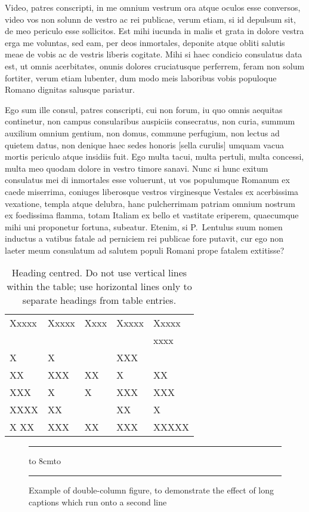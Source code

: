 \documentclass{ifacmtg}
\begin{document}
Video, patres conscripti, in me omnium vestrum ora atque oculos esse
conversos, video vos non solunn de vestro ac rei publicae, verum etiam,
si id depulsum sit, de meo periculo esse sollicitos. Est mihi iucunda in
malis et grata in dolore vestra erga me voluntas, sed eam, per deos
inmortales, deponite atque obliti salutis meae de vobis ac de vestris
liberis cogitate. Mihi si haec condicio consulatus data est, ut omnis
acerbitates, onunis dolores cruciatusque perferrem, feram non solum
fortiter, verum etiam lubenter, dum modo meis laboribus vobis populoque
Romano dignitas salusque pariatur. \par Ego sum ille consul, patres
conscripti, cui non forum, iu quo omnis aequitas continetur, non campus
consularibus auspiciis consecratus, non curia, summum auxilium omnium
gentium, non domus, commune perfugium, non lectus ad quietem datus, non
denique haec sedes honoris [sella curulis] umquam vacua mortis periculo
atque insidiis fuit.  Ego multa tacui, multa pertuli, multa concessi,
multa meo quodam dolore in vestro timore sanavi. Nunc si hunc exitum
consulatus mei di inmortales esse voluerunt, ut vos populumque Romanum
ex caede miserrima, coniuges liberosque vestros virginesque Vestales ex
acerbissima vexatione, templa atque delubra, hanc pulcherrimam patriam
omnium nostrum ex foedissima flamma, totam Italiam ex bello et vastitate
eriperem, quaecumque mihi uni proponetur fortuna, subeatur. Etenim, si
P.~Lentulus suum nomen inductus a vatibus fatale ad perniciem rei
publicae fore putavit, cur ego non laeter meum consulatum ad salutem
populi Romani prope fatalem extitisse?

\begin{table}[htbp]
  \caption{Heading centred. Do not use vertical lines within the
    table; use horizontal lines only to separate headings from table
    entries.}
  \label{tab:1}
  \begin{tabular*}{\hsize}{lllll}
\hline
Xxxxx & Xxxxx & Xxxx & Xxxxx & Xxxxx \\
      &       &      &       & xxxx  \\
\hline
X     & X     &      & XXX   &       \\
XX    & XXX   & XX   & X     & XX    \\
XXX   & X     & X    & XXX   & XXX   \\
XXXX  & XX    &      & XX    & X     \\
X XX  & XXX   & XX   & XXX   & XXXXX \\
\hline
  \end{tabular*}
\end{table}
\begin{figure*}
\hrule
\vbox to 8cm{\vfill \hbox to \vfill}
\hrule
\caption{Example of double-column figure, to demonstrate the effect of
  long captions which run onto a second line}
\label{song}
\end{figure*}
\end{document}
